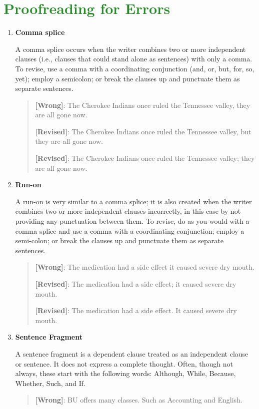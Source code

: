 \documentclass[12pt, hidelinks]{article} %
\begin{document}
\section{\textcolor{ForestGreen}{Proofreading for Errors}}

\begin{enumerate}

\item \textbf{Comma splice}

A comma splice occurs when the writer combines two or more independent clauses (i.e., clauses that could stand alone as sentences) with only a comma. To revise, use a comma with a coordinating conjunction (and, or, but, for, so, yet); employ a semicolon; or break the clauses up and punctuate them as separate sentences.
\begin{quote}
\textbf{[Wrong]}: The Cherokee Indians once ruled the Tennessee valley, they are all gone now.

\textbf{[Revised]}:  The Cherokee Indians once ruled the Tennessee valley, but they are all gone now.

\textbf{[Revised]}: The Cherokee Indians once ruled the Tennessee valley; they are all gone now.
\end{quote}
\item \textbf{Run-on}

A run-on is very similar to a comma splice; it is also created when the writer combines two or more independent clauses incorrectly, in this case by not providing any punctuation between them.  To revise, do as you would with a comma splice and use a comma with a coordinating conjunction; employ a semi-colon; or break the clauses up and punctuate them as separate sentences.
\begin{quote}
\textbf{[Wrong]}: The medication had a side effect it caused severe dry mouth.

\textbf{[Revised]}: The medication had a side effect; it caused severe dry mouth.

\textbf{[Revised]}: The medication had a side effect. It caused severe dry mouth.
\end{quote}
\item \textbf{Sentence Fragment}

A sentence fragment is a dependent clause treated as an independent clause or sentence. It does not express a complete thought. Often, though not always, these start with the following words: Although, While, Because, Whether, Such, and If.
\begin{quote}
\textbf{[Wrong]}: BU offers many classes. Such as Accounting and English.


\end{quote}
\end{enumerate}
\end{document}
